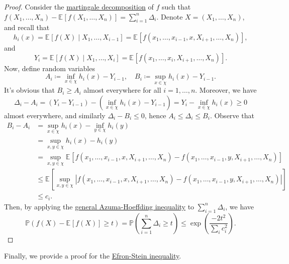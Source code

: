 \begin{proof}
	Consider the \hyperref[def:martingale-decomposition]{martingale decomposition} of \(f\) such that \(f(X_1, \dots , X_n) - \mathbb{E}_{}\left[f(X_1, \dots , X_n) \right] = \sum_{i=1}^{n} \Delta _{i}\). Denote \(X = (X_1, \dots , X_n)\), and recall that
	\[
		h_i(x)
		= \mathbb{E}_{}\left[f(X) \mid X_1, \dots , X_{i-1} \right]
		= \mathbb{E}_{}\left[f(x_1, \dots , x_{i-1}, x, X_{i+1}, \dots , X_n) \right],
	\]
	and
	\[
		Y_i
		= \mathbb{E}_{}\left[f(X) \mid X_1, \dots , X_i \right]
		= \mathbb{E}_{}\left[f(x_1, \dots , x_i, X_{i+1}, \dots , X_n) \right].
	\]
	Now, define random variables
	\[
		A_i \coloneqq \inf _{x\in \chi } h_i(x) - Y_{i-1} ,\quad
		B_i \coloneqq \sup _{x\in \chi } h_i(x) - Y_{i-1} .
	\]
	It's obvious that \(B_i \geq A_i\) almost everywhere for all \(i = 1, \dots , n\). Moreover, we have
	\[
		\Delta _i - A_i
		= (Y_i - Y_{i-1}) - (\inf _{x\in \chi } h_i(x) - Y_{i-1} )
		= Y_i - \inf _{x\in \chi } h_i(x) \geq 0
	\]
	almost everywhere, and similarly \(\Delta _i - B_i \leq 0\), hence \(A_i \leq \Delta _i \leq B_i\). Observe that
	\begin{align*}
		B_i - A_i
		 & = \sup _{x\in \chi } h_i(x) - \inf _{y\in \chi } h_i(y)                                                                                                                            \\
		 & = \sup _{x, y\in \chi } h_i(x) - h_i(y)                                                                                                                                            \\
		 & = \sup _{x, y\in \chi } \mathbb{E}_{}\left[f(x_1, \dots , x_{i-1}, x, X_{i+1}, \dots , X_n ) - f(x_1, \dots , x_{i-1}, y, X_{i+1}, \dots , X_n)\right]                             \\
		 & \leq \mathbb{E}_{}\left[\sup _{x, y\in \chi } \left\vert f(x_1, \dots , x_{i-1}, x, X_{i+1}, \dots , X_n ) - f(x_1, \dots , x_{i-1}, y, X_{i+1}, \dots , X_n) \right\vert  \right] \\
		 & \leq c_i.
	\end{align*}
	Then, by applying the \hyperref[col:general-Azuma-Hoeffding-inequality]{general Azuma-Hoeffding inequality} to \(\sum_{i=1}^{n} \Delta _i\), we have
	\[
		\mathbb{P} (f(X) - \mathbb{E}_{}\left[f(X) \right] \geq t )
		= \mathbb{P} \left( \sum_{i=1}^{n} \Delta _i \geq t \right)
		\leq \exp \left( \frac{-2t^2}{\sum_{i} c_i^2} \right).
	\]
\end{proof}

Finally, we provide a proof for the \hyperref[thm:Efron-Stein-inequality]{Efron-Stein inequality}.


